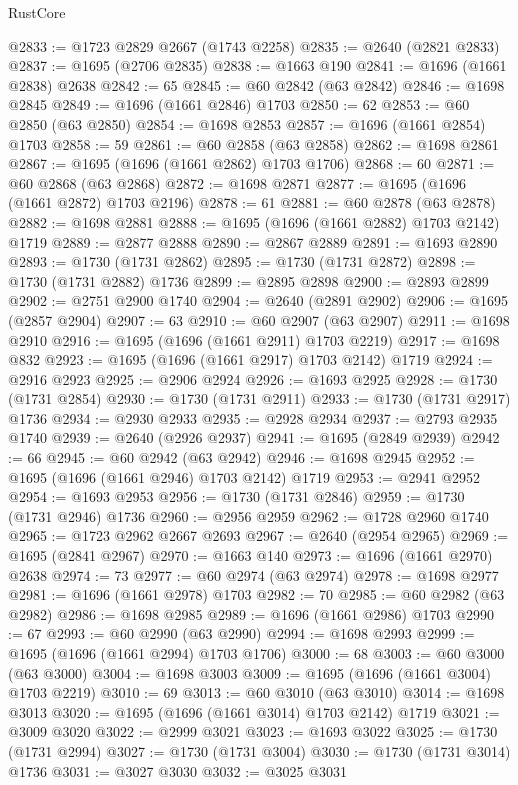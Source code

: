 \begin{lexlean}{RustCore}
\begin{coremodule}
@2833 := @1723 @2829 @2667 (@1743 @2258)
@2835 := @2640 (@2821 @2833)
@2837 := @1695 (@2706 @2835)
@2838 := @1663 @190
@2841 := @1696 (@1661 @2838) @2638
@2842 := 65
@2845 := @60 @2842 (@63 @2842)
@2846 := @1698 @2845
@2849 := @1696 (@1661 @2846) @1703
@2850 := 62
@2853 := @60 @2850 (@63 @2850)
@2854 := @1698 @2853
@2857 := @1696 (@1661 @2854) @1703
@2858 := 59
@2861 := @60 @2858 (@63 @2858)
@2862 := @1698 @2861
@2867 := @1695 (@1696 (@1661 @2862) @1703 @1706)
@2868 := 60
@2871 := @60 @2868 (@63 @2868)
@2872 := @1698 @2871
@2877 := @1695 (@1696 (@1661 @2872) @1703 @2196)
@2878 := 61
@2881 := @60 @2878 (@63 @2878)
@2882 := @1698 @2881
@2888 := @1695 (@1696 (@1661 @2882) @1703 @2142) @1719
@2889 := @2877 @2888
@2890 := @2867 @2889
@2891 := @1693 @2890
@2893 := @1730 (@1731 @2862)
@2895 := @1730 (@1731 @2872)
@2898 := @1730 (@1731 @2882) @1736
@2899 := @2895 @2898
@2900 := @2893 @2899
@2902 := @2751 @2900 @1740
@2904 := @2640 (@2891 @2902)
@2906 := @1695 (@2857 @2904)
@2907 := 63
@2910 := @60 @2907 (@63 @2907)
@2911 := @1698 @2910
@2916 := @1695 (@1696 (@1661 @2911) @1703 @2219)
@2917 := @1698 @832
@2923 := @1695 (@1696 (@1661 @2917) @1703 @2142) @1719
@2924 := @2916 @2923
@2925 := @2906 @2924
@2926 := @1693 @2925
@2928 := @1730 (@1731 @2854)
@2930 := @1730 (@1731 @2911)
@2933 := @1730 (@1731 @2917) @1736
@2934 := @2930 @2933
@2935 := @2928 @2934
@2937 := @2793 @2935 @1740
@2939 := @2640 (@2926 @2937)
@2941 := @1695 (@2849 @2939)
@2942 := 66
@2945 := @60 @2942 (@63 @2942)
@2946 := @1698 @2945
@2952 := @1695 (@1696 (@1661 @2946) @1703 @2142) @1719
@2953 := @2941 @2952
@2954 := @1693 @2953
@2956 := @1730 (@1731 @2846)
@2959 := @1730 (@1731 @2946) @1736
@2960 := @2956 @2959
@2962 := @1728 @2960 @1740
@2965 := @1723 @2962 @2667 @2693
@2967 := @2640 (@2954 @2965)
@2969 := @1695 (@2841 @2967)
@2970 := @1663 @140
@2973 := @1696 (@1661 @2970) @2638
@2974 := 73
@2977 := @60 @2974 (@63 @2974)
@2978 := @1698 @2977
@2981 := @1696 (@1661 @2978) @1703
@2982 := 70
@2985 := @60 @2982 (@63 @2982)
@2986 := @1698 @2985
@2989 := @1696 (@1661 @2986) @1703
@2990 := 67
@2993 := @60 @2990 (@63 @2990)
@2994 := @1698 @2993
@2999 := @1695 (@1696 (@1661 @2994) @1703 @1706)
@3000 := 68
@3003 := @60 @3000 (@63 @3000)
@3004 := @1698 @3003
@3009 := @1695 (@1696 (@1661 @3004) @1703 @2219)
@3010 := 69
@3013 := @60 @3010 (@63 @3010)
@3014 := @1698 @3013
@3020 := @1695 (@1696 (@1661 @3014) @1703 @2142) @1719
@3021 := @3009 @3020
@3022 := @2999 @3021
@3023 := @1693 @3022
@3025 := @1730 (@1731 @2994)
@3027 := @1730 (@1731 @3004)
@3030 := @1730 (@1731 @3014) @1736
@3031 := @3027 @3030
@3032 := @3025 @3031

\end{coremodule}
\end{lexlean}
